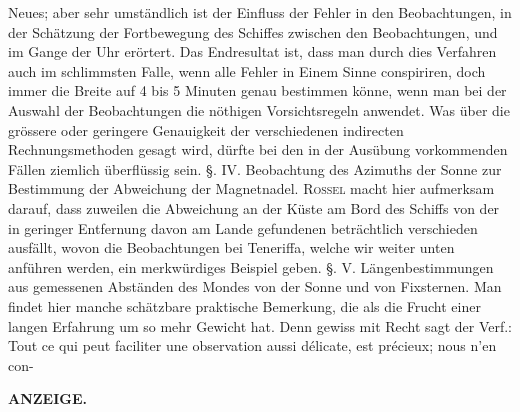Neues; aber sehr umständlich ist der Einfluss der Fehler in den Beobachtungen, in der Schätzung der Fortbewegung des Schiffes zwischen den Beobachtungen, und im Gange der Uhr erörtert. Das Endresultat ist, dass man durch dies Verfahren auch im schlimmsten Falle, wenn alle Fehler in Einem Sinne conspiriren, doch immer die Breite auf 4 bis 5 Minuten genau bestimmen könne, wenn man bei der Auswahl der Beobachtungen die nöthigen Vorsichtsregeln anwendet. Was über die grössere oder geringere Genauigkeit der verschiedenen indirecten Rechnungsmethoden gesagt wird, dürfte bei den in der Ausübung vorkommenden Fällen ziemlich überflüssig sein. §. IV. Beobachtung des Azimuths der Sonne zur Bestimmung der Abweichung der Magnetnadel. \textsc{Rossel} macht hier aufmerksam darauf, dass zuweilen die Abweichung an der Küste am Bord des Schiffs von der in geringer Entfernung davon am Lande gefundenen beträchtlich verschieden ausfällt, wovon die Beobachtungen bei Teneriffa, welche wir weiter unten anführen werden, ein merkwürdiges Beispiel geben. §. V. Längenbestimmungen aus gemessenen Abständen des Mondes von der Sonne und von Fixsternen. Man findet hier manche schätzbare praktische Bemerkung, die als die Frucht einer langen Erfahrung um so mehr Gewicht hat. Denn gewiss mit Recht sagt der Verf.: Tout ce qui peut faciliter une observation aussi délicate, est précieux; nous n'en con-\par
{}
\clearpage
\noindent{}%
%
\parbox[t]{\dimexpr\linewidth-24mm\relax}{\centering\footnotesize\bfseries ANZEIGE.\par}%
\makebox[12mm][r]{}\par\nobreak\medskip
